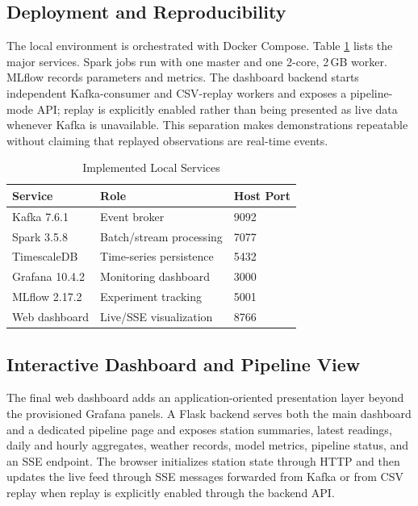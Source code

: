 \documentclass[12pt,a4paper]{article}
\begin{document}
\subsection{Deployment and Reproducibility}
The local environment is orchestrated with Docker Compose. Table
\ref{tab:services} lists the major services. Spark jobs run with one master and
one 2-core, 2\,GB worker. MLflow records parameters and metrics. The dashboard
backend starts independent Kafka-consumer and CSV-replay workers and exposes a
pipeline-mode API; replay is explicitly enabled rather than being presented as
live data whenever Kafka is unavailable. This separation makes demonstrations
repeatable without claiming that replayed observations are real-time events.

\begin{table}[H]
\caption{Implemented Local Services}
\label{tab:services}
\centering
\begin{tabular}{lll}
\toprule
\textbf{Service} & \textbf{Role} & \textbf{Host Port}\\
\midrule
Kafka 7.6.1 & Event broker & 9092\\
Spark 3.5.8 & Batch/stream processing & 7077\\
TimescaleDB & Time-series persistence & 5432\\
Grafana 10.4.2 & Monitoring dashboard & 3000\\
MLflow 2.17.2 & Experiment tracking & 5001\\
Web dashboard & Live/SSE visualization & 8766\\
\bottomrule
\end{tabular}
\end{table}

\subsection{Interactive Dashboard and Pipeline View}
The final web dashboard adds an application-oriented presentation layer beyond
the provisioned Grafana panels. A Flask backend serves both the main dashboard
and a dedicated pipeline page and exposes station summaries, latest readings,
daily and hourly aggregates, weather records, model metrics, pipeline status,
and an SSE endpoint. The browser initializes station state through HTTP and
then updates the live feed through SSE messages forwarded from Kafka or from
CSV replay when replay is explicitly enabled through the backend API.
\end{document}
